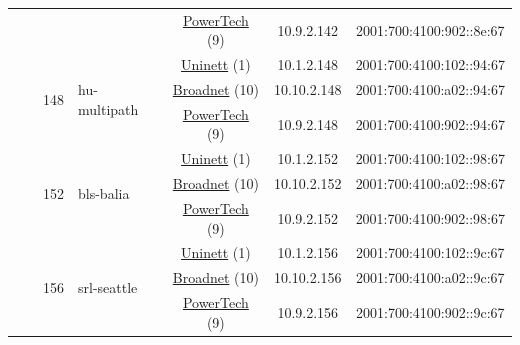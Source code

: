 \begin{small}
\begin{center}
\begin{longtable}{|c|c|c|c|c|c|c|c|}
  &  &  &  & \multicolumn{2}{|c|}{\tiny{\href{http://www.powertech.no}{PowerTech} (9)}} & \tiny{10.9.2.142} & \tiny{2001:700:4100:902::8e:67} \\* \cline{3-3}\cline{4-4}\cline{5-5}\cline{6-6}\cline{7-7}\cline{8-8}
  &  & \multirow{3}{*}{\tiny{148}} & \multicolumn{1}{|l|}{\multirow{3}{*}{\tiny{hu-multipath}}} & \multicolumn{2}{|c|}{\tiny{\href{https://www.uninett.no}{Uninett} (1)}} & \tiny{10.1.2.148} & \tiny{2001:700:4100:102::94:67} \\* \cline{5-5}\cline{6-6}\cline{7-7}\cline{8-8}
  &  &  &  & \multicolumn{2}{|c|}{\tiny{\href{https://www.broadnet.no}{Broadnet} (10)}} & \tiny{10.10.2.148} & \tiny{2001:700:4100:a02::94:67} \\* \cline{5-5}\cline{6-6}\cline{7-7}\cline{8-8}
  &  &  &  & \multicolumn{2}{|c|}{\tiny{\href{http://www.powertech.no}{PowerTech} (9)}} & \tiny{10.9.2.148} & \tiny{2001:700:4100:902::94:67} \\* \cline{3-3}\cline{4-4}\cline{5-5}\cline{6-6}\cline{7-7}\cline{8-8}
  &  & \multirow{3}{*}{\tiny{152}} & \multicolumn{1}{|l|}{\multirow{3}{*}{\tiny{bls-balia}}} & \multicolumn{2}{|c|}{\tiny{\href{https://www.uninett.no}{Uninett} (1)}} & \tiny{10.1.2.152} & \tiny{2001:700:4100:102::98:67} \\* \cline{5-5}\cline{6-6}\cline{7-7}\cline{8-8}
  &  &  &  & \multicolumn{2}{|c|}{\tiny{\href{https://www.broadnet.no}{Broadnet} (10)}} & \tiny{10.10.2.152} & \tiny{2001:700:4100:a02::98:67} \\* \cline{5-5}\cline{6-6}\cline{7-7}\cline{8-8}
  &  &  &  & \multicolumn{2}{|c|}{\tiny{\href{http://www.powertech.no}{PowerTech} (9)}} & \tiny{10.9.2.152} & \tiny{2001:700:4100:902::98:67} \\* \cline{3-3}\cline{4-4}\cline{5-5}\cline{6-6}\cline{7-7}\cline{8-8}
  &  & \multirow{3}{*}{\tiny{156}} & \multicolumn{1}{|l|}{\multirow{3}{*}{\tiny{srl-seattle}}} & \multicolumn{2}{|c|}{\tiny{\href{https://www.uninett.no}{Uninett} (1)}} & \tiny{10.1.2.156} & \tiny{2001:700:4100:102::9c:67} \\* \cline{5-5}\cline{6-6}\cline{7-7}\cline{8-8}
  &  &  &  & \multicolumn{2}{|c|}{\tiny{\href{https://www.broadnet.no}{Broadnet} (10)}} & \tiny{10.10.2.156} & \tiny{2001:700:4100:a02::9c:67} \\* \cline{5-5}\cline{6-6}\cline{7-7}\cline{8-8}
  &  &  &  & \multicolumn{2}{|c|}{\tiny{\href{http://www.powertech.no}{PowerTech} (9)}} & \tiny{10.9.2.156} & \tiny{2001:700:4100:902::9c:67} \\* \cline{3-3}\cline{4-4}\cline{5-5}\cline{6-6}\cline{7-7}\cline{8-8}

\end{longtable}
\end{center}
\end{small}
